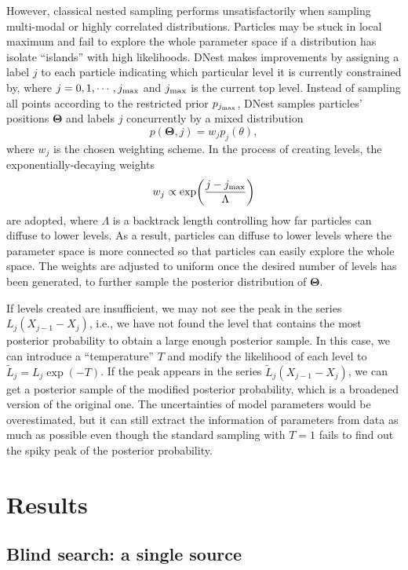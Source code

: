 \documentclass[times,tight]{aastex631}
\begin{document}
However, classical nested sampling performs unsatisfactorily when sampling multi-modal or highly correlated distributions.
Particles may be stuck in local maximum and fail to explore the whole parameter space if a distribution has isolate ``islands'' with high likelihoods.
DNest makes improvements by assigning a label $j$ to each particle indicating which particular level it is currently constrained by, where $j=0,1,\cdots,j_{\rm max}$ and $j_{\rm max}$ is the current top level.
Instead of sampling all points according to the restricted prior $p_{j_{\rm max}}$, DNest samples particles' positions $\bm{\Theta}$ and labels $j$ concurrently by a mixed distribution
\begin{equation}
    p(\bm{\Theta},j) = w_j p_j(\theta),
\end{equation}
where $w_j$ is the chosen weighting scheme.
In the process of creating levels, the exponentially-decaying weights
\begin{equation}
    w_j \propto \exp(\frac{j-j_{\rm max}}{\Lambda})
\end{equation}
are adopted, where $\Lambda$ is a backtrack length controlling how far particles can diffuse to lower levels.
As a result, particles can diffuse to lower levels where the parameter space is more connected so that particles can easily explore the whole space.
The weights are adjusted to uniform once the desired number of levels has been generated, to further sample the posterior distribution of $\bm{\Theta}$.

If levels created are insufficient, we may not see the peak in the series $L_j(X_{j-1} - X_{j})$, i.e., we have not found the level that contains the most posterior probability to obtain a large enough posterior sample.
In this case, we can introduce a ``temperature'' $T$ and modify the likelihood of each level to $\tilde{L}_j = L_j \exp(-T)$.
If the peak appears in the series $\tilde{L}_j(X_{j-1} - X_{j})$, we can get a posterior sample of the modified posterior probability, which is a broadened version of the original one.
The uncertainties of model parameters would be overestimated, but it can still extract the information of parameters from data as much as possible even though the standard sampling with $T=1$ fails to find out the spiky peak of the posterior probability.

\section{Results}
\subsection{Blind search: a single source \label{subsec:blind_single}}
\end{document}
